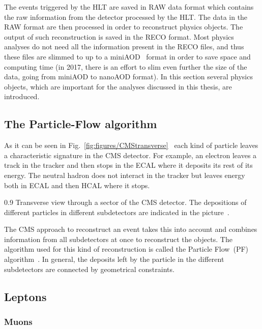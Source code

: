 The events triggered by the HLT are saved in RAW data format which contains the raw information from the detector processed by the HLT. The data in the RAW format are then processed in order to reconstruct physics objects. The output of such reconstruction is saved in the RECO format. Most physics analyses do not need all the information present in the RECO files, and thus these files are slimmed to up to a miniAOD~\cite{Petrucciani:2029414} format in order to save space and computing time (in 2017, there is an effort to slim even further the size of the data, going from miniAOD to nanoAOD format). In this section several physics objects, which are important for the analyses discussed in this thesis, are introduced.


\subsection{The Particle-Flow algorithm}

As it can be seen in Fig.~\ref{fig:figures/CMStransverse}~\cite{Sirunyan:2017ulk} each kind of particle leaves a characteristic signature in the CMS detector. For example, an electron leaves a track in the tracker and then stops in the ECAL where it deposits its rest of its energy. The neutral hadron does not interact in the tracker but leaves energy both in ECAL and then HCAL where it stops.

                 {0.9}       %
                 { Transverse view through a sector of the CMS detector. The depositions of different particles in different subdetectors are indicated in the picture~\cite{Sirunyan:2017ulk}. }

The CMS approach to reconstruct an event takes this into account and combines information from all subdetectors at once to reconstruct the objects. The algorithm used for this kind of reconstruction is called the Particle Flow~(PF) algorithm~\cite{Sirunyan:2017ulk}. In general, the deposits left by the particle in the different subdetectors are connected by geometrical constraints.


\subsection{Leptons}

\subsubsection{Muons}

